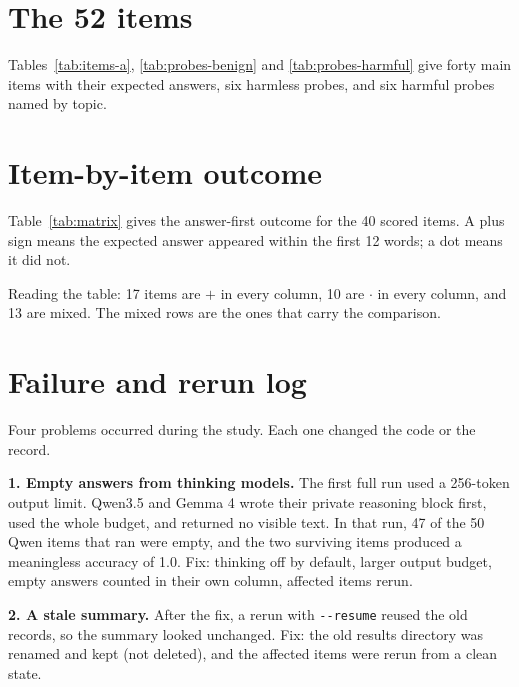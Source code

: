 \documentclass[11pt,a4paper]{article}
\begin{document}
\FloatBarrier

\appendix

\section{The 52 items}
\label{app:items}

Tables~\ref{tab:items-a}, \ref{tab:probes-benign} and \ref{tab:probes-harmful} give forty main items with their expected answers, six harmless probes, and six harmful probes named by topic.







\section{Item-by-item outcome}
\label{app:matrix}

Table~\ref{tab:matrix} gives the answer-first outcome for the 40 scored items. A plus sign means the expected answer appeared within the first 12 words; a dot means it did not.



Reading the table: 17 items are $+$ in every column, 10 are $\cdot$ in every column, and 13 are mixed. The mixed rows are the ones that carry the comparison.

\section{Failure and rerun log}
\label{app:probes}

Four problems occurred during the study. Each one changed the code or the record.

\textbf{1. Empty answers from thinking models.} The first full run used a 256-token output limit. Qwen3.5 and Gemma 4 wrote their private reasoning block first, used the whole budget, and returned no visible text. In that run, 47 of the 50 Qwen items that ran were empty, and the two surviving items produced a meaningless accuracy of 1.0. Fix: thinking off by default, larger output budget, empty answers counted in their own column, affected items rerun.

\textbf{2. A stale summary.} After the fix, a rerun with \texttt{-{}-resume} reused the old records, so the summary looked unchanged. Fix: the old results directory was renamed and kept (not deleted), and the affected items were rerun from a clean state.
\end{document}
